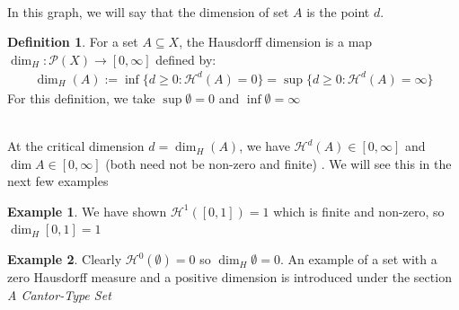 \documentclass{article}
\theoremstyle{plain}
\theoremstyle{definition}
\newtheorem{defn}[thm]{Definition}
\newtheorem*{ex}{Example}
\theoremstyle{remark}
\begin{document}
\begin{itemize}
\begin{center}

      \end{center}  

\end{itemize}

~\\ In this graph, we will say that the dimension of set $A$ is the point $d$. 
\begin{defn}
    For a set $A \subseteq X$, the Hausdorff dimension is a map $\dim_H : \mathcal{P}(X) \to [0,\infty]$ defined by:
        \begin{align*}
            \dim_H(A) := \inf\{d \geq 0 : \mathcal{H}^d(A) = 0\} = \sup\{d \geq 0 : \mathcal{H}^d(A) = \infty\}
        \end{align*}
        For this definition, we take $\sup \emptyset =0$ and $\inf \emptyset = \infty$
\end{defn}~\\
At the critical dimension $d = \dim_H(A)$, we have $\mathcal{H}^d(A) \in [0, \infty ]$ and $\dim A \in [0,\infty ]$ (both need not be non-zero and finite) . We will see this in the next few examples
\newpage

\begin{ex}
    We have shown $\mathcal{H}^1([0,1]) = 1$ which is finite and non-zero, so $\dim_H [0,1] = 1$
\end{ex}

\begin{ex}
    Clearly $\mathcal{H}^0(\emptyset) = 0$ so $\dim_H \emptyset = 0$. An example of a set with a zero Hausdorff measure and a positive dimension is introduced under the section \textit{A Cantor-Type Set}
\end{ex}
\end{document}
